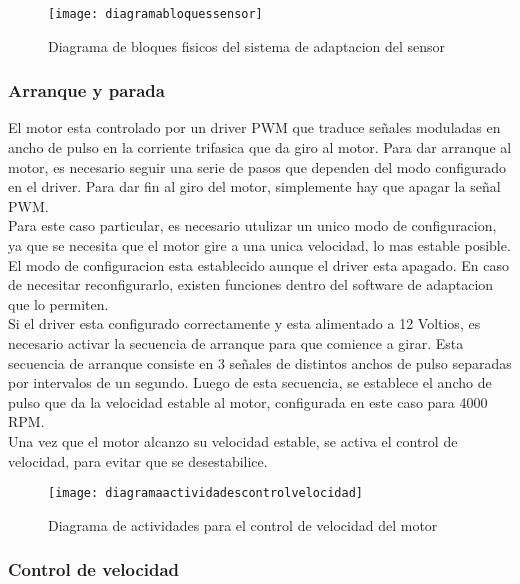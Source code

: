 \begin{figure}[h]
  \centering
  \texttt{[image: diagramabloquessensor]}
  \caption{Diagrama de bloques fisicos del sistema de adaptacion del sensor}\label{fig:diagramabloquessensor}
\end{figure}

\subsubsection{Arranque y parada} %
\label{ssub:arranque_y_parada}

El motor esta controlado por un driver PWM que traduce señales moduladas en ancho de pulso en la corriente trifasica que da giro al motor. Para dar arranque al motor, es necesario seguir una serie de pasos que dependen del modo configurado en el driver. Para dar fin al giro del motor, simplemente hay que apagar la señal PWM. \\

Para este caso particular, es necesario utulizar un unico modo de configuracion, ya que se necesita que el motor gire a una unica velocidad, lo mas estable posible. El modo de configuracion esta establecido aunque el driver esta apagado. En caso de necesitar reconfigurarlo, existen funciones dentro del software de adaptacion que lo permiten. \\

Si el driver esta configurado correctamente y esta alimentado a 12 Voltios, es necesario activar la secuencia de arranque para que comience a girar. Esta secuencia de arranque consiste en 3 señales de distintos anchos de pulso separadas por intervalos de un segundo. Luego de esta secuencia, se establece el ancho de pulso que da la velocidad estable al motor, configurada en este caso para 4000 RPM. \\

Una vez que el motor alcanzo su velocidad estable, se activa el control de velocidad, para evitar que se desestabilice. 

\begin{figure}[h]
  \centering
  \texttt{[image: diagramaactividadescontrolvelocidad]}
  \caption{Diagrama de actividades para el control de velocidad del motor}\label{fig:diagramaactividadescontrolvelocidad}
\end{figure}


\subsubsection{Control de velocidad} %
\label{ssub:control_de_velocidad}

